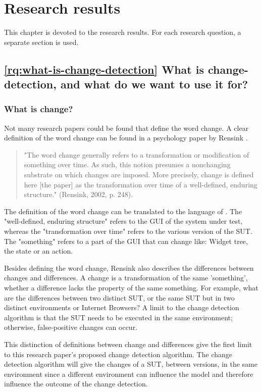 \chapter{Research results}

This chapter is devoted to the research results. For each research question, a separate section is used. 

\section{\ref{rq:what-is-change-detection} What is change-detection, and what do we want to use it for?}

\subsection{What is change?} \label{what-is-change}

Not many research papers could be found that define the word change. A clear definition of the word change can be found in a psychology paper by Rensink \cite{rensink2002change}.

\begin{quote}
    "The word change generally refers to a transformation or modification of something over time. As such, this notion presumes a nonchanging substrate on which changes are imposed. More precisely, change is defined here [the paper] as the transformation over time of a well-defined, enduring structure." (Rensink, 2002, p. 248).
\end{quote}

The definition of the word change can be translated to the language of \testar. The "well-defined, enduring structure" refers to the GUI of the system under test, whereas the "transformation over time" refers to the various version of the SUT. The "something" refers to a part of the GUI that can change like: Widget tree, the state or an action. 

Besides defining the word change, Rensink also describes the differences between changes and differences. A change is a transformation of the same 'something', whether a difference lacks the property of the same something. For example, what are the differences between two distinct SUT, or the same SUT but in two distinct environments or Internet Browsers? A limit to the change detection algorithm is that the SUT needs to be executed in the same environment; otherwise, false-positive changes can occur.

This distinction of definitions between change and differences give the first limit to this research paper's proposed change detection algorithm. The change detection algorithm will give the changes of a SUT, between versions, in the same environment since a different environment can influence the model and therefore influence the outcome of the change detection.

